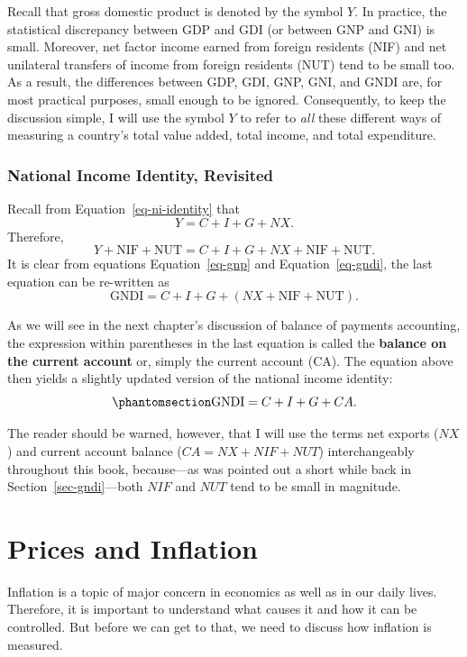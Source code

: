 \documentclass[
  letterpaper,
]{book}
\theoremstyle{plain}
\theoremstyle{remark}
\begin{document}
Recall that gross domestic product is denoted by the symbol \(Y\). In
practice, the statistical discrepancy between GDP and GDI (or between
GNP and GNI) is small. Moreover, net factor income earned from foreign
residents (NIF) and net unilateral transfers of income from foreign
residents (NUT) tend to be small too. As a result, the differences
between GDP, GDI, GNP, GNI, and GNDI are, for most practical purposes,
small enough to be ignored. Consequently, to keep the discussion simple,
I will use the symbol \(Y\) to refer to \emph{all} these different ways
of measuring a country's total value added, total income, and total
expenditure.

\subsubsection{National Income Identity, Revisited}\label{sec-nii-2}


Recall from Equation~\ref{eq-ni-identity} that \[ Y=C+I+G+NX.\]
Therefore, \[Y+\text{NIF}+\text{NUT}=C+I+G+NX+\text{NIF}+\text{NUT}.\]
It is clear from equations Equation~\ref{eq-gnp} and
Equation~\ref{eq-gndi}, the last equation can be re-written as \[
\text{GNDI}=C+I+G+(NX+\text{NIF}+\text{NUT}). 
\]

As we will see in the next chapter's discussion of balance of payments
accounting, the expression within parentheses in the last equation is
called the \textbf{balance on the current account} or, simply the
current account (CA). The equation above then yields a slightly updated
version of the national income identity:
\begin{equation}\phantomsection\label{eq-nii-ca}{
\text{GNDI}=C+I+G+CA.
}\end{equation}

The reader should be warned, however, that I will use the terms net
exports (\(NX\)) and current account balance (\(CA=NX+NIF+NUT\))
interchangeably throughout this book, because---as was pointed out a
short while back in Section~\ref{sec-gndi}---both \(NIF\) and \(NUT\)
tend to be small in magnitude.

\section{Prices and Inflation}\label{sec-p-pi}

Inflation is a topic of major concern in economics as well as in our
daily lives. Therefore, it is important to understand what causes it and
how it can be controlled. But before we can get to that, we need to
discuss how inflation is measured.
\end{document}
